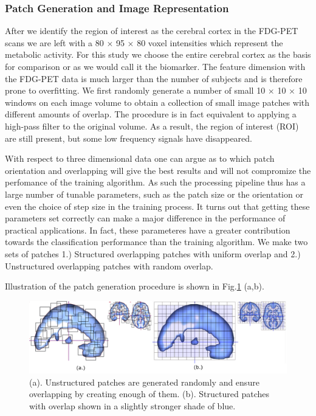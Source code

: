 \documentclass[authoryear,preprint,revi	ew,12pt]{elsarticle}
\begin{document}
\subsubsection{Patch Generation and Image Representation}
\label{sec:patch_generation}
After we identify the region of interest as the cerebral cortex in the FDG-PET scans we are left with a 80 $ \times $ 95 $ \times $ 80 voxel intensities which represent the metabolic activity. For this study we choose the entire cerebral cortex as the basis for comparison or as we would call it the biomarker. The feature dimension with the FDG-PET data is much larger than the number of subjects and is therefore prone to overfitting. We first randomly generate a number of small 10 $ \times $ 10 $ \times $ 10 windows on each image volume to obtain a collection of small image patches with different amounts of overlap. The procedure is in fact equivalent to applying a high-pass filter to the original volume. As a result, the region of interest (ROI) are still present, but some low frequency signals have disappeared. 

With respect to three dimensional data one can argue as to which patch orientation and overlapping will give the best results and will not compromize the perfomance of the training algorithm. As such the processing pipeline thus has a large number of tunable parameters, such as the patch size or the orientation or even the choice of step size in the training process. It turns out that getting these parameters set correctly can make a major difference in the performance of practical applications. In fact, these parameteres have a greater contribution towards the classification performance than the training algorithm. We make two sets of patches 1.) Structured overlapping patches with uniform overlap and 2.) Unstructured overlapping patches with random overlap.

Illustration of the patch generation procedure is shown in Fig.\ref{fig:patches} (a,b). 

\begin{figure}
	\centering
	\includegraphics[width=\linewidth]{figures/patches}
	\caption[Unstructured and Structured patches in Axial, Sagittal and Coronal view of the brain.]{(a). Unstructured patches are generated randomly and ensure overlapping by creating enough of them. (b). Structured patches with overlap shown in a slightly stronger shade of blue.}
	\label{fig:patches}
\end{figure}
\end{document}
